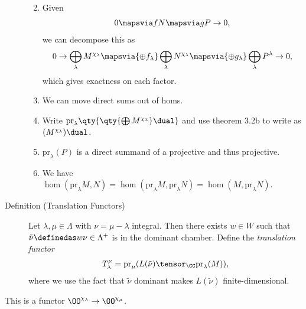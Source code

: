 \begin{description}
\begin{enumerate}
\def\labelenumi{\arabic{enumi}.}
\tightlist
\item
  Given
  \begin{align*}0 \mapsvia f N \mapsvia g P \to 0,\end{align*} we can
  decompose this as
  \begin{align*}0 \to \bigoplus_\lambda M^{\chi_\lambda} \mapsvia{\oplus f_\lambda} \bigoplus_\lambda N^{\chi_\lambda} \mapsvia {\oplus g_\lambda} \bigoplus_\lambda P^\lambda \to 0,\end{align*}
  which gives exactness on each factor.
\item
  We can move direct sums out of homs.
\item
  Write
  \(\mathrm{pr}_\lambda \qty{ \qty{\bigoplus M^{\chi_\lambda} }\dual }\)
  and use theorem 3.2b to write as \((M^{\chi_\lambda})\dual\).
\item
  \(\mathrm{pr}_\lambda(P)\) is a direct summand of a projective and
  thus projective.
\item
  We have
  \(\hom(\mathrm{pr}_\lambda M, N) = \hom(\mathrm{pr}_\lambda M, \mathrm{pr}_\lambda N) = \hom(M, \mathrm{pr}_\lambda N)\).
\end{enumerate}
\item[Definition (Translation Functors)]
Let \(\lambda, \mu \in \Lambda\) with \(\nu = \mu - \lambda\) integral.
Then there exists \(w\in W\) such that
\(\tilde \nu \definedas w\nu \in \Lambda^+\) is in the dominant chamber.
Define the \emph{translation functor}
\begin{align*}T_\lambda^\mu = \mathrm{pr}_\mu(L(\tilde \nu) \tensor_\CC \mathrm{pr}_\lambda(M)),\end{align*}
where we use the fact that \(\tilde \nu\) dominant makes
\(L(\tilde \nu)\) finite-dimensional.
\end{description}

This is a functor \(\OO^{\chi_\lambda} \to \OO^{\chi_\mu}\).

